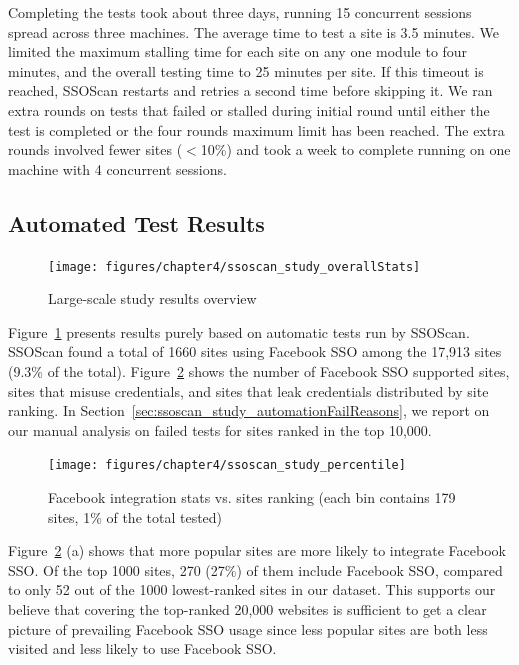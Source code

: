Completing the tests took about three days, running 15 concurrent sessions spread across three machines.  The average time to test a site is 3.5 minutes.  We limited the maximum stalling time for each site on any one module to four minutes, and the overall testing time to 25 minutes per site.  If this timeout is reached, SSOScan restarts and retries a second time before skipping it.  We ran extra rounds on tests that failed or stalled during initial round until either the test is completed or the four rounds maximum limit has been reached.  The extra rounds involved fewer sites ($<$10\%) and took a week to complete running on one machine with 4 concurrent sessions.

\subsection{Automated Test Results}
\label{sec:ssoscan_study_generalstats}

\begin{figure}[hbt]
\centering
\texttt{[image: figures/chapter4/ssoscan\_study\_overallStats]}
\caption{Large-scale study results overview}
\label{fig:ssoscan_study_overallStats}
\end{figure}

Figure~\ref{fig:ssoscan_study_overallStats} presents results purely based on automatic tests run by SSOScan.  SSOScan found a total of 1660 sites using Facebook SSO among the 17,913 sites (9.3\% of the total).  Figure~\ref{fig:ssoscan_study_percentile} shows the number of Facebook SSO supported sites, sites that misuse credentials, and sites that leak credentials distributed by site ranking.  In Section~\ref{sec:ssoscan_study_automationFailReasons}, we report on our manual analysis on failed tests for sites ranked in the top 10,000.

\begin{figure}[tbh]
\centering
\texttt{[image: figures/chapter4/ssoscan\_study\_percentile]}
\caption{Facebook integration stats vs. sites ranking (each bin contains 179 sites, 1\% of the total tested)}
\label{fig:ssoscan_study_percentile}
\end{figure}

 Figure~\ref{fig:ssoscan_study_percentile} (a) shows that more popular sites are more likely to integrate Facebook SSO.  Of the top 1000 sites, 270 (27\%) of them include Facebook SSO, compared to only 52 out of the 1000 lowest-ranked sites in our dataset.  This supports our believe that covering the top-ranked 20,000 websites is sufficient to get a clear picture of prevailing Facebook SSO usage since less popular sites are both less visited and less likely to use Facebook SSO.

